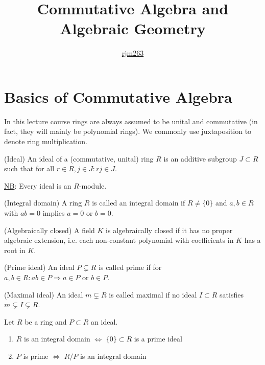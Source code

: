 \documentclass[a4paper,11pt]{article}
\title{\boldmath Commutative Algebra and Algebraic Geometry}
\author{\href{https://github.com/rjm263}{rjm263}}
\begin{document}
	
	\maketitle
	\flushbottom    
	\newpage

	\section{Basics of Commutative Algebra}

		In this lecture course rings are always assumed to be unital and commutative (in fact, they will mainly be polynomial rings). We commonly use juxtaposition to denote ring multiplication.

		\begin{defi}(Ideal)
			An ideal of a (commutative, unital) ring $R$ is an additive subgroup $J\subset R$ such that for all $r\in R,j\in J: rj\in J$.
		\end{defi}

		\noindent\underline{NB}: Every ideal is an $R$-module.
		
		\begin{defi}(Integral domain)
			A ring $R$ is called an integral domain if $R\neq\{0\}$ and $a,b\in R$ with $ab=0$ implies $a=0$ or $b=0$.
		\end{defi}

		\begin{defi}(Algebraically closed)
			A field $K$ is algebraically closed if it has no proper algebraic extension, i.e. each non-constant polynomial with coefficients in $K$ has a root in $K$.
		\end{defi}

		\begin{defi}(Prime ideal)
			An ideal $P\subsetneq R$ is called prime if for $a,b\in R: ab\in P\Longrightarrow a\in P\text{ or } b\in P$.
		\end{defi}

		\begin{defi}(Maximal ideal)
			An ideal $m\subsetneq R$ is called maximal if no ideal $I\subset R$ satisfies $m\subsetneq I\subsetneq R$. 
		\end{defi}

		\begin{prop}
			Let $R$ be a ring and $P\subset R$ an ideal.
			\begin{enumerate}
				\item $R$ is an integral domain $\Longleftrightarrow$ $\{0\}\subset R$ is a prime ideal
				\item $P$ is prime $\Longleftrightarrow$ $R/P$ is an integral domain
			\end{enumerate}
		\end{prop}
\end{document}
